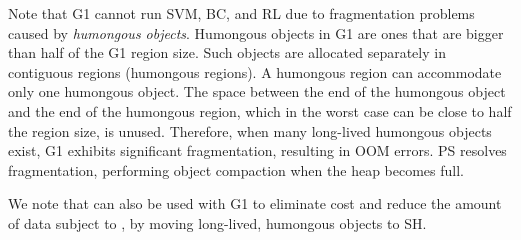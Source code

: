 Note that G1 cannot run SVM, BC, and RL due to fragmentation problems
caused by \emph{humongous objects}. Humongous objects in G1 are ones
that are bigger than half of the G1 region size. Such objects are
allocated separately in contiguous regions (humongous regions). A
humongous region can accommodate only one humongous object. The space
between the end of the humongous object and the end of the humongous
region, which in the worst case can be close to half the region size,
is unused. Therefore, when many long-lived humongous objects exist, G1
exhibits significant fragmentation, resulting in OOM errors. PS
resolves fragmentation, performing object compaction when the heap
becomes full.

We note that \teraheapName{} can also be used with G1 to eliminate \teraheapSD cost
and reduce the amount of data subject to \teraheapGC, by moving long-lived,
humongous objects to SH.
